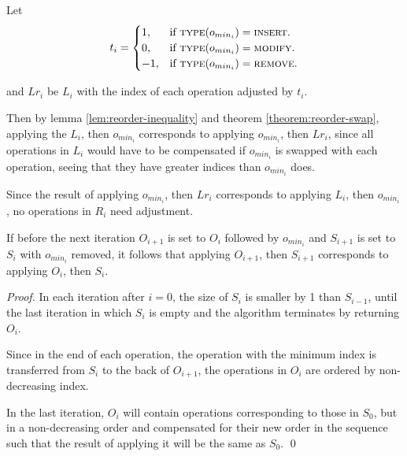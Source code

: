 \begin{theorem}

Let
\begin{equation*}
t_i = 
\begin{cases}
    1, & \text{if $\textsc{type}(o_{min_i}) = \textsc{insert}$}.\\
    0, & \text{if $\textsc{type}(o_{min_i}) = \textsc{modify}$}.\\
    -1, & \text{if $\textsc{type}(o_{min_i}) = \textsc{remove}$}.
\end{cases}
\end{equation*}

and $Lr_i$ be $L_i$ with the index of each operation adjusted by $t_i$.

Then by lemma \ref{lem:reorder-inequality} and theorem
\ref{theorem:reorder-swap}, applying the $L_i$, then $o_{min_i}$ corresponds to
applying $o_{min_i}$, then $Lr_i$, since all operations in $L_i$ would have to
be compensated if $o_{min_i}$ is swapped with each operation, seeing that they
have greater indices than $o_{min_i}$ does.

Since the result of applying $o_{min_i}$, then $Lr_i$ corresponds to applying
$L_i$, then $o_{min_i}$, no operations in $R_i$ need adjustment.

If before the next iteration $O_{i+1}$ is set to $O_i$ followed by $o_{min_i}$
and $S_{i+1}$ is set to $S_i$ with $o_{min_i}$ removed, it follows that applying
$O_{i+1}$, then $S_{i+1}$ corresponds to applying $O_i$, then $S_i$.

\end{theorem}

\begin{proof}

In each iteration after $i=0$, the size of $S_i$ is smaller by 1 than $S_{i-1}$,
until the last iteration in which $S_i$ is empty and the algorithm terminates by
returning $O_i$.

Since in the end of each operation, the operation with the minimum index is
transferred from $S_i$ to the back of $O_{i+1}$, the operations in $O_i$ are
ordered by non-decreasing index.

In the last iteration, $O_i$ will contain operations corresponding to those in
$S_0$, but in a non-decreasing order and compensated for their new order in the
sequence such that the result of applying it will be the same as $S_0$. \qed

\end{proof}

